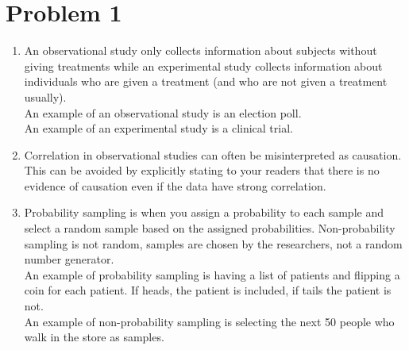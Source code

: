 \documentclass{article}
\title{\thetitle}
\author{\theauthor}
\begin{document}
\maketitle

\section*{Problem 1}
\begin{enumerate}
\item An observational study only collects information about subjects without giving treatments while an experimental study collects information about individuals who are given a treatment (and who are not given a treatment usually). \\
An example of an observational study is an election poll. \\
An example of an experimental study is a clinical trial. \\
\item Correlation in observational studies can often be misinterpreted as causation. This can be avoided by explicitly stating to your readers that there is no evidence of causation even if the data have strong correlation. \\
\item Probability sampling is when you assign a probability to each sample and select a random sample based on the assigned probabilities. Non-probability sampling is not random, samples are chosen by the researchers, not a random number generator. \\
An example of probability sampling is having a list of patients and flipping a coin for each patient. If heads, the patient is included, if tails the patient is not. \\
An example of non-probability sampling is selecting the next 50 people who walk in the store as samples. \\

\end{enumerate}
\end{document}
